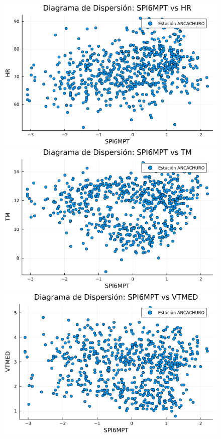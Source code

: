 \begin{figure}[htbp]
\begin{minipage}{0.32\textwidth}
    \centering
    \includegraphics[width=\linewidth]{Capitulos/Scaterplot/ANCACHURO_SPI6MPT_vs_HR.png}
\end{minipage}\hfill
\begin{minipage}{0.32\textwidth}
    \centering
    \includegraphics[width=\linewidth]{Capitulos/Scaterplot/ANCACHURO_SPI6MPT_vs_TM.png}
\end{minipage}\hfill
\begin{minipage}{0.32\textwidth}
    \centering
    \includegraphics[width=\linewidth]{Capitulos/Scaterplot/ANCACHURO_SPI6MPT_vs_VTMED.png}
\end{minipage}


\end{figure}
